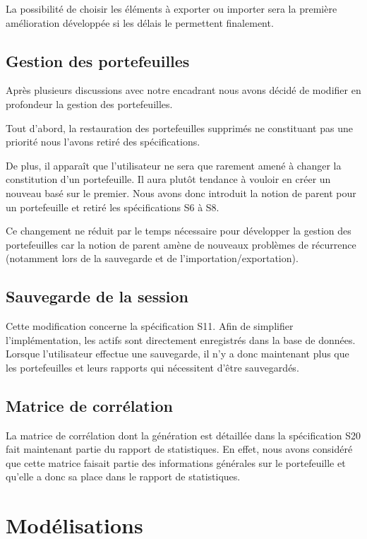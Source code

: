 \documentclass[a4paper,titlepage,french]{report}
\begin{document}
La possibilité de choisir les éléments à exporter ou importer sera la première amélioration développée si les délais le permettent finalement.


\subsection{Gestion des portefeuilles}

Après plusieurs discussions avec notre encadrant nous avons décidé de modifier en profondeur la gestion des portefeuilles.

Tout d'abord, la restauration des portefeuilles supprimés ne constituant pas une priorité nous l'avons retiré des spécifications.

De plus, il apparaît que l'utilisateur ne sera que rarement amené à changer la constitution d'un portefeuille.
Il aura plutôt tendance à vouloir en créer un nouveau basé sur le premier.
Nous avons donc introduit la notion de parent pour un portefeuille et retiré les spécifications S6 à S8.

Ce changement ne réduit par le temps nécessaire pour développer la gestion des portefeuilles car la notion de parent amène de nouveaux problèmes de récurrence (notamment lors de la sauvegarde et de l'importation/exportation).


\subsection{Sauvegarde de la session}

Cette modification concerne la spécification S11.
Afin de simplifier l'implémentation, les actifs sont directement enregistrés dans la base de données.
Lorsque l'utilisateur effectue une sauvegarde, il n'y a donc maintenant plus que les portefeuilles et leurs rapports qui nécessitent d'être sauvegardés.


\subsection{Matrice de corrélation}

La matrice de corrélation dont la génération est détaillée dans la spécification S20 fait maintenant partie du rapport de statistiques.
En effet, nous avons considéré que cette matrice faisait partie des informations générales sur le portefeuille et qu'elle a donc sa place dans le rapport de statistiques.


\section{Modélisations}
\end{document}
